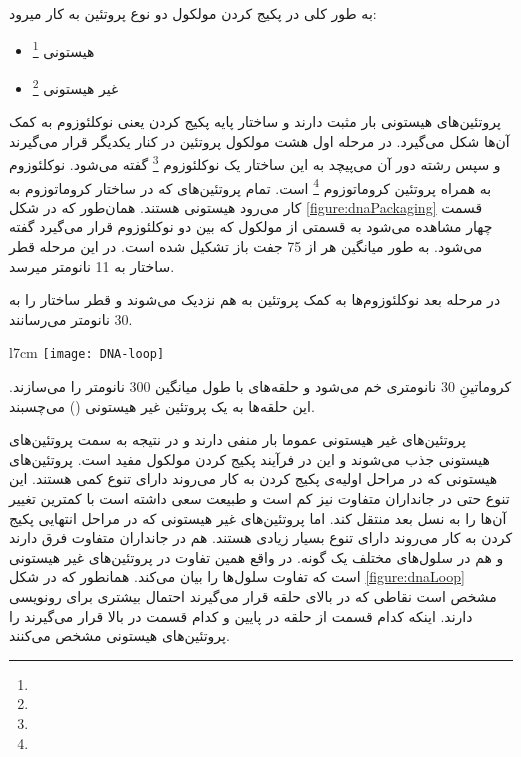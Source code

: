 به طور کلی در پکیج کردن مولکول
دو نوع پروتئین به کار میرود:
\begin{itemize}
\item هیستونی
\footnote{}
\item غیر هیستونی
\footnote{}
\end{itemize}
پروتئین‌های هیستونی بار مثبت دارند و ساختار پایه پکیج کردن یعنی نوکلئوزوم به کمک آن‌ها شکل می‌گیرد.
در مرحله اول هشت مولکول پروتئین در کنار یکدیگر قرار می‌گیرند و سپس رشته
دور آن می‌پیچد به این ساختار یک نوکلئوزوم
\footnote{}
گفته می‌شود. نوکلئوزوم به همراه پروتئین
کروماتوزوم
\footnote{} 
است. تمام پروتئین‌های که در ساختار کروماتوزوم به کار می‌رود هیستونی هستند. همان‌طور که در شکل
\ref{figure:dnaPackaging}
قسمت چهار مشاهده می‌شود به قسمتی از مولکول
که بین دو نوکلئوزوم قرار می‌گیرد
گفته می‌شود.
به طور میانگین هر
از 75 جفت باز تشکیل شده است.
در این مرحله قطر ساختار به 11 نانومتر میرسد. 

در مرحله بعد نوکلئوزوم‌ها به کمک پروتئین
به هم نزدیک می‌شوند و قطر ساختار را به 30 نانومتر می‌رسانند.

\begin{wrapfigure}[14]{l}{7cm}
	\centering
	\texttt{[image: DNA-loop]}
	\caption{حلقه‌های مولکول 
	به طول متوسط 300 نانومتر}
	\label{figure:dnaLoop}
\end{wrapfigure}

کروماتینِ 30 نانومتری خم می‌شود و حلقه‌های با طول میانگین 300 نانومتر را می‌سازند. این حلقه‌ها به یک پروتئین غیر هیستونی
()
می‌چسبند.

پروتئین‌های غیر هیستونی عموما بار منفی دارند و در نتیجه به سمت پروتئین‌های هیستونی جذب می‌شوند و این در فرآیند پکیج کردن مولکول
مفید است.
پروتئین‌های هیستونی که در مراحل اولیه‌ی پکیج کردن به کار می‌روند دارای تنوع کمی هستند. این تنوع حتی در جانداران متفاوت نیز کم است و طبیعت سعی داشته است با کمترین تغییر‌ آن‌ها را به نسل بعد منتقل کند. اما پروتئین‌های غیر هیستونی که در مراحل انتهایی پکیج کردن به کار می‌روند دارای تنوع بسیار زیادی هستند. هم در جانداران متفاوت فرق دارند و هم در سلول‌های مختلف یک گونه. در واقع همین تفاوت در پروتئین‌های غیر هیستونی است که تفاوت سلول‌ها را بیان می‌کند. همانطور که در شکل
\ref{figure:dnaLoop}
مشخص است نقاطی که در بالای حلقه قرار می‌گیرند احتمال بیشتری برای رونویسی دارند. اینکه کدام قسمت از حلقه در پایین و کدام قسمت در بالا قرار می‌گیرند را پروتئین‌های هیستونی مشخص می‌کنند.

\pagebreak
